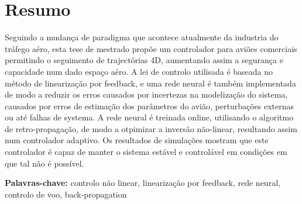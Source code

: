 
\section*{Resumo}


Seguindo a mudança de paradigma que acontece atualmente da industria do tráfego aéro, esta tese de mestrado propõe um controlador para aviões comerciais permitindo o seguimento de trajectórias 4D, aumentando assim a segurança e capacidade num dado espaço aéro. A lei de controlo utilisada é baseada no método de linearização por feedback, e uma rede neural é também implementada de modo a reduzir os erros causados por incertezas na modelização do sistema, causados por erros de estimação dos parâmetros do avião, perturbações externas ou até falhas de systema. A rede neural é treinada online, utilisando o algoritmo de retro-propagação, de modo a otpimizar a inversão não-linear, resultando assim num controlador adaptivo. Os resultados de simulações mostram que este controlador é capaz de manter o sistema estável e controlável em condições em que tal não é possível.

\vfill

\textbf{\Large Palavras-chave:} controlo não linear, linearização por feedback, rede neural, controlo de voo, back-propagation

